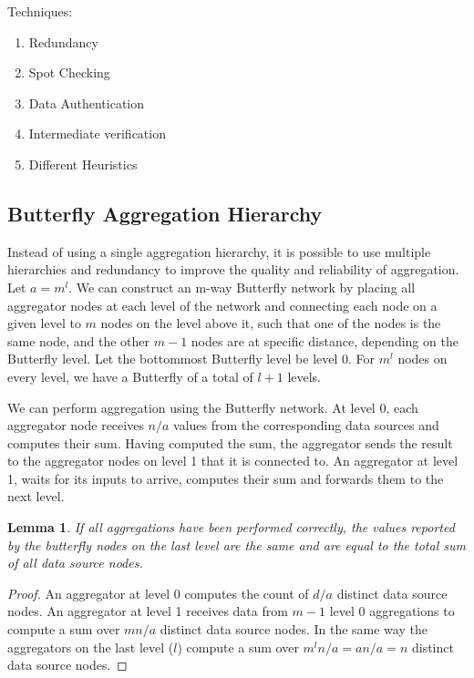 \documentclass[11pt,twocolumn]{MyTightStyle}
\theoremstyle{plain}
\newtheorem{lem}[thm]{Lemma}
\theoremstyle{definition}
\theoremstyle{remark}
\numberwithin{equation}{section}
\begin{document}
Techniques:
\begin{enumerate}
  \item Redundancy
  \item Spot Checking
  \item Data Authentication
  \item Intermediate verification
  \item Different Heuristics
\end{enumerate}


\subsection{Butterfly Aggregation Hierarchy}
Instead of using a single aggregation hierarchy, it is possible to use
multiple hierarchies and redundancy to improve the quality and
reliability of aggregation. Let $a=m^l$. We can construct an m-way
Butterfly network by placing all aggregator nodes at each level of the network
and connecting each node on a given level to $m$ nodes on the level above
it, such that one of the nodes is the same node, and the other $m-1$
nodes are at specific distance, depending on the Butterfly level. Let
the bottommost Butterfly level be level 0. For $m^l$ nodes on 
every level, we have a Butterfly of a total of $l+1$ levels. 

We can perform aggregation using the Butterfly network. At level 0,
each aggregator node receives $n/a$ values from the corresponding data
sources and computes their sum. Having computed the sum, the
aggregator sends the result to the aggregator nodes on level 1 that it
is connected to. An aggregator at level 1, waits for its inputs to
arrive, computes their sum and forwards them to the next level. 

\begin{lem} If all aggregations have been performed correctly, the
  values reported by the butterfly nodes on the last level are the
  same and are equal to the total sum of all data source nodes.
\end{lem}

\begin{proof}
  An aggregator at level 0 computes the count of $d/a$ distinct data source
  nodes. An aggregator at level 1 receives data from  $m-1$ level 0
  aggregations to compute a sum over $mn/a$ distinct data source
  nodes. In the same way the aggregators on the last level ($l$)
  compute a sum over $m^ln/a = an/a = n$ distinct data source nodes.
\end{proof}
\end{document}

